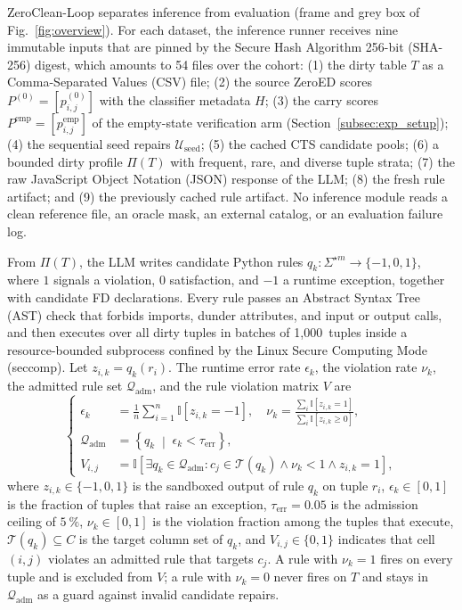 \documentclass[conference]{IEEEtran}
\begin{document}
ZeroClean-Loop separates inference from evaluation (frame and grey box of Fig.~\ref{fig:overview}). For each dataset, the inference runner receives nine immutable inputs that are pinned by the Secure Hash Algorithm 256-bit (SHA-256) digest, which amounts to 54 files over the cohort: (1) the dirty table $T$ as a Comma-Separated Values (CSV) file; (2) the source ZeroED scores $P^{(0)} = [p_{i,j}^{(0)}]$ with the classifier metadata $H$; (3) the carry scores $P^{\mathrm{emp}} = [p_{i,j}^{\mathrm{emp}}]$ of the empty-state verification arm (Section~\ref{subsec:exp_setup}); (4) the sequential seed repairs $\mathcal{U}_{\mathrm{seed}}$; (5) the cached CTS candidate pools; (6) a bounded dirty profile $\Pi(T)$ with frequent, rare, and diverse tuple strata; (7) the raw JavaScript Object Notation (JSON) response of the LLM; (8) the fresh rule artifact; and (9) the previously cached rule artifact. No inference module reads a clean reference file, an oracle mask, an external catalog, or an evaluation failure log.

From $\Pi(T)$, the LLM writes candidate Python rules $q_k : \Sigma^{\star m} \to \{-1, 0, 1\}$, where $1$ signals a violation, $0$ satisfaction, and $-1$ a runtime exception, together with candidate FD declarations. Every rule passes an Abstract Syntax Tree (AST) check that forbids imports, dunder attributes, and input or output calls, and then executes over all dirty tuples in batches of 1,000~tuples inside a resource-bounded subprocess confined by the Linux Secure Computing Mode (seccomp). Let $z_{i,k} = q_k(r_i)$. The runtime error rate $\epsilon_k$, the violation rate $\nu_k$, the admitted rule set $\mathcal{Q}_{\mathrm{adm}}$, and the rule violation matrix $V$ are
\begin{equation}
\label{eq:rule_admission}
\left\{
\begin{aligned}
\epsilon_k &= \frac{1}{n}\sum_{i=1}^{n} \mathbb{I}\!\left[z_{i,k} = -1\right], \quad
\nu_k = \frac{\sum_{i} \mathbb{I}\!\left[z_{i,k} = 1\right]}{\sum_{i} \mathbb{I}\!\left[z_{i,k} \ge 0\right]}, \\
\mathcal{Q}_{\mathrm{adm}} &= \left\{q_k \;\middle|\; \epsilon_k < \tau_{\mathrm{err}} \right\}, \\
V_{i,j} &= \mathbb{I}\!\left[\exists q_k \in \mathcal{Q}_{\mathrm{adm}} : c_j \in \mathcal{T}(q_k) \land \nu_k < 1 \land z_{i,k} = 1\right],
\end{aligned}
\right.
\end{equation}
where $z_{i,k} \in \{-1,0,1\}$ is the sandboxed output of rule $q_k$ on tuple $r_i$, $\epsilon_k \in [0,1]$ is the fraction of tuples that raise an exception, $\tau_{\mathrm{err}} = 0.05$ is the admission ceiling of $5~\%$, $\nu_k \in [0,1]$ is the violation fraction among the tuples that execute, $\mathcal{T}(q_k) \subseteq C$ is the target column set of $q_k$, and $V_{i,j} \in \{0,1\}$ indicates that cell $(i,j)$ violates an admitted rule that targets $c_j$. A rule with $\nu_k = 1$ fires on every tuple and is excluded from $V$; a rule with $\nu_k = 0$ never fires on $T$ and stays in $\mathcal{Q}_{\mathrm{adm}}$ as a guard against invalid candidate repairs.
\end{document}
